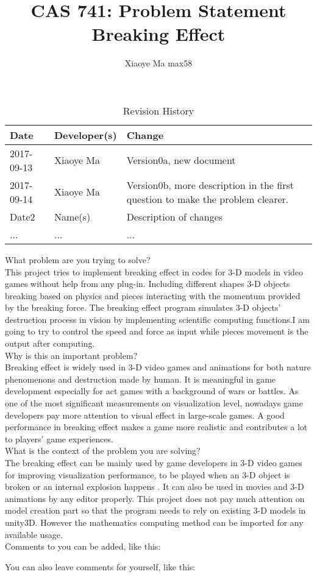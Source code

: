 \documentclass{article}
\title{CAS 741: Problem Statement\\Breaking Effect}
\author{Xiaoye Ma max58}
\date{}
\begin{document}
\maketitle

\begin{table}[hp]
\caption{Revision History} \label{TblRevisionHistory}
\begin{tabularx}{\textwidth}{llX}
\toprule
\textbf{Date} & \textbf{Developer(s)} & \textbf{Change}\\
\midrule
2017-09-13 & Xiaoye Ma & Version0a, new document\\
2017-09-14 & Xiaoye Ma & Version0b, more description in the first question to make the problem clearer.\\
Date2 & Name(s) & Description of changes\\
... & ... & ...\\
\bottomrule
\end{tabularx}
\end{table}

What problem are you trying to solve?\\

This project tries to implement breaking effect in codes for 3-D models in video games without help from any plug-in. Including different shapes 3-D objects breaking based on physics and pieces interacting with the momentum provided by the breaking force. The breaking effect program simulates 3-D objects’ destruction process in vision by implementing scientific computing functions.I am going to try to control the speed and force as input while pieces movement is the output after computing.\\      

Why is this an important problem?\\

Breaking effect is widely used in 3-D video games and animations for both nature phenomenons and destruction made by human. It is meaningful in game development especially for act games with a background of wars or battles. As one of the most significant measurements on visualization level, nowadays game developers pay more attention to visual effect in large-scale games. A good performance in breaking effect makes a game more realistic and contributes a lot to players’ game experiences.\\ 

What is the context of the problem you are solving?\\

The breaking effect can be mainly used by game developers in 3-D video games for improving visualization performance, to be played when an 3-D object is broken or an internal explosion happens . It can also be used in movies and 3-D animations by any editor properly. This project does not pay much attention on model creation part so that the program needs to rely on existing 3-D models in unity3D. However the mathematics computing method can be imported for any available usage. \\

Comments to you can be added, like this:


You can also leave comments for yourself, like this:

\end{document}
